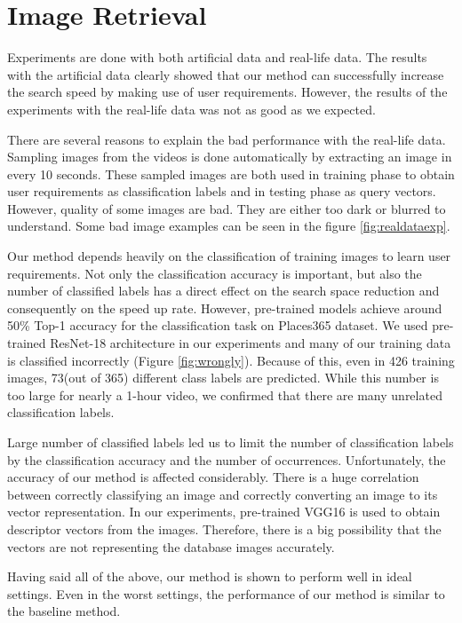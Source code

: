 \section*{Image Retrieval}

Experiments are done with both artificial data and real-life data. 
The results with the artificial data clearly showed that our method can successfully increase the search speed by making use of user requirements.
However, the results of the experiments with the real-life data was not as good as we expected. 

There are several reasons to explain the bad performance with the real-life data. 
Sampling images from the videos is done automatically by extracting an image in every 10 seconds. 
These sampled images are both used in training phase to obtain user requirements as classification labels and in testing phase as query vectors.
However, quality of some images are bad. They are either too dark or blurred to understand. Some bad image examples can be seen in the figure \ref{fig:realdataexp}.

Our method depends heavily on the classification of training images to learn user requirements. 
Not only the classification accuracy is important, but also the number of classified labels has a direct effect on the search space reduction and consequently on the speed up rate.
However, pre-trained models achieve around 50\% Top-1 accuracy for the classification task on Places365 dataset.
We used pre-trained ResNet-18 architecture in our experiments and many of our training data is classified incorrectly (Figure \ref{fig:wrongly}).
Because of this, even in 426 training images, 73(out of 365) different class labels are predicted. 
While this number is too large for nearly a 1-hour video, we confirmed that there are many unrelated classification labels.

Large number of classified labels led us to limit the number of classification labels by the classification accuracy and the number of occurrences.
Unfortunately, the accuracy of our method is affected considerably.
There is a huge correlation between correctly classifying an image and correctly converting an image to its vector representation.
In our experiments, pre-trained VGG16 is used to obtain descriptor vectors from the images.
Therefore, there is a big possibility that the vectors are not representing the database images accurately.

Having said all of the above, our method is shown to perform well in ideal settings. 
Even in the worst settings, the performance of our method is similar to the baseline method. 


